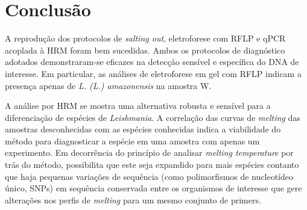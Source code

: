 \section{Conclusão}

A reprodução dos protocolos de \textit{salting out}, eletroforese com RFLP e
qPCR acoplada à HRM foram bem sucedidas. Ambos os protocolos de diagnóstico
adotados demonstraram-se eficazes na detecção sensível e específica do DNA de
interesse. Em particular, as análises de eletroforese em gel com RFLP indicam a
presença apenas de \textit{L. (L.) amazonensis} na amostra W. 

A análise por HRM se mostra uma alternativa robusta e sensível para a
diferenciação de espécies de \textit{Leishmania}. A correlação das curvas de
\textit{melting} das amostras desconhecidas com as espécies conhecidas indica a
viabilidade do método para diagnosticar a espécie em uma amostra com apenas um
experimento. Em decorrência do princípio de analisar \textit{melting
temperature} por trás do método, possibilita que este seja expandido para mais
espécies contanto que haja pequenas variações de sequência (como polimorfismos
de nucleotídeo único, SNPs) em sequência conservada entre os organismos de
interesse que gere alterações nos perfis de \textit{melting} para um mesmo
conjunto de primers. 

